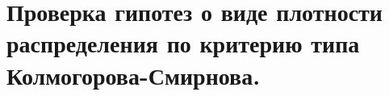 \documentclass[polytech/stats/exam-2023/stats-exam-2023.tex]{subfiles}
\begin{document}
\section{Проверка гипотез о виде плотности распределения по критерию типа Колмогорова-Смирнова.}
\end{document}
